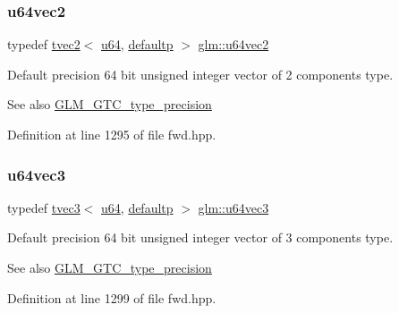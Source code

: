 \subsubsection{\texorpdfstring{u64vec2}{u64vec2}}
{\footnotesize\ttfamily typedef \mbox{\hyperlink{structglm_1_1tvec2}{tvec2}}$<$ \mbox{\hyperlink{group__gtc__type__precision_ga71cedd4972f9cb1a5e14dfe5ab83ecd7}{u64}}, \mbox{\hyperlink{namespaceglm_a0f04f086094c747d227af4425893f545a9d21ccd8b5a009ec7eb7677befc3bf51}{defaultp}} $>$ \mbox{\hyperlink{group__gtc__type__precision_gaddd85665767e5d32aee8516f00c45f59}{glm\+::u64vec2}}}

Default precision 64 bit unsigned integer vector of 2 components type. \begin{DoxySeeAlso}{See also}
\mbox{\hyperlink{group__gtc__type__precision}{G\+L\+M\+\_\+\+G\+T\+C\+\_\+type\+\_\+precision}} 
\end{DoxySeeAlso}


Definition at line 1295 of file fwd.\+hpp.

\mbox{\label{group__gtc__type__precision_ga7f104c29d70170cfb2223b29f7985bd4}} 
\subsubsection{\texorpdfstring{u64vec3}{u64vec3}}
{\footnotesize\ttfamily typedef \mbox{\hyperlink{structglm_1_1tvec3}{tvec3}}$<$ \mbox{\hyperlink{group__gtc__type__precision_ga71cedd4972f9cb1a5e14dfe5ab83ecd7}{u64}}, \mbox{\hyperlink{namespaceglm_a0f04f086094c747d227af4425893f545a9d21ccd8b5a009ec7eb7677befc3bf51}{defaultp}} $>$ \mbox{\hyperlink{group__gtc__type__precision_ga7f104c29d70170cfb2223b29f7985bd4}{glm\+::u64vec3}}}

Default precision 64 bit unsigned integer vector of 3 components type. \begin{DoxySeeAlso}{See also}
\mbox{\hyperlink{group__gtc__type__precision}{G\+L\+M\+\_\+\+G\+T\+C\+\_\+type\+\_\+precision}} 
\end{DoxySeeAlso}


Definition at line 1299 of file fwd.\+hpp.

\mbox{\label{group__gtc__type__precision_gadafdefd5524bf6a48bb7c47edb787ae5}} 
